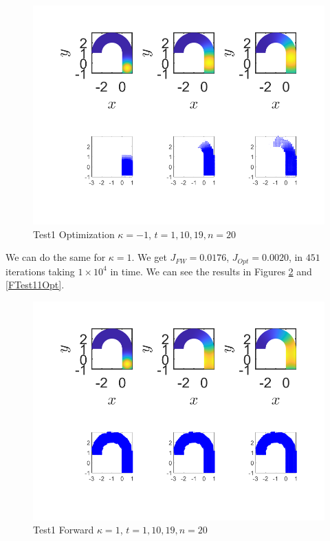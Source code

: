 \documentclass[11pt, a4paper]{article}
\theoremstyle{definition}
\begin{document}
    \begin{figure}[h]
    	\centering
    	\includegraphics[scale=0.7]{Test10n1Opt.png}
    	\caption{Test1 Optimization $\kappa = -1$, $t =1, 10, 19, n = 20$} 
    	\label{FTest1n1Opt}
    \end{figure}
    We can do the same for $\kappa = 1$. We get $J_{FW} = 0.0176$, $J_{Opt} = 0.0020$, in $451$ iterations taking $ 1\times 10^4$ in time. We can see the results in Figures \ref{FTest11FW} and \ref{FTest11Opt}.
    \begin{figure}[h]
    	\centering
    	\includegraphics[scale=0.7]{Test101FW.png}
    	\caption{Test1 Forward $\kappa = 1$, $t =1, 10, 19, n = 20$} 
    	\label{FTest11FW}
    \end{figure}
\end{document}
